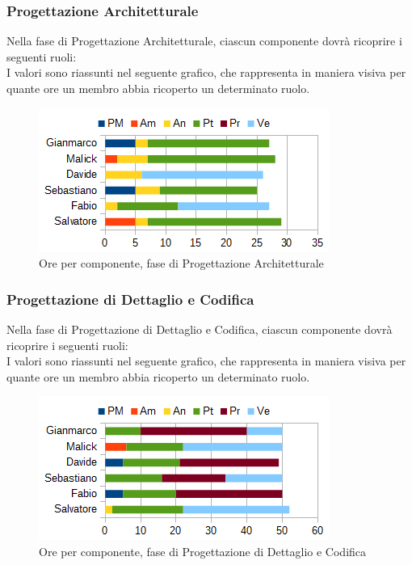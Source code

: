 		\subsubsection{Progettazione Architetturale}
		Nella fase di Progettazione Architetturale, ciascun componente dovrà ricoprire i seguenti ruoli: \\
		I valori sono riassunti nel seguente grafico, che rappresenta in maniera visiva per quante ore un membro abbia ricoperto un determinato ruolo.
		\begin{figure}[htbp]
			\centering
			\includegraphics[scale=1]{immagini/grafici/progettazione_architetturale-barra.png}
			\caption{Ore per componente, fase di Progettazione Architetturale}
		\end{figure}
		\subsubsection{Progettazione di Dettaglio e Codifica}
		Nella fase di Progettazione di Dettaglio e Codifica, ciascun componente dovrà ricoprire i seguenti ruoli: \\
		I valori sono riassunti nel seguente grafico, che rappresenta in maniera visiva per quante ore un membro abbia ricoperto un determinato ruolo.
		\begin{figure}[htbp]
			\centering
			\includegraphics[scale=1]{immagini/grafici/progettazione_dettaglio_codifica-barra.png}
			\caption{Ore per componente, fase di Progettazione di Dettaglio e Codifica}
		\end{figure}
